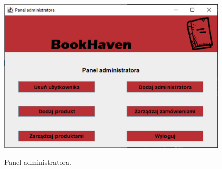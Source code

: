 \begin{figure}[H]
    \centering
    \includegraphics[width=\linewidth]{figures/fig_0011.eps}\\
    \caption{Panel administratora.\label{fig11}}
\end{figure}